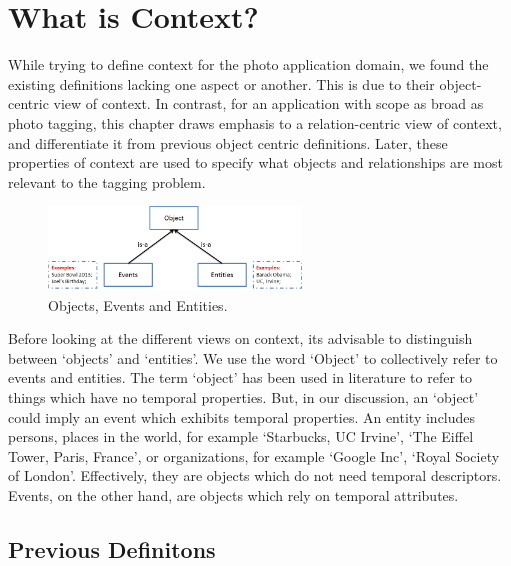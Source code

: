 \chapter{What is Context?}

While trying to define context for the photo application domain, we found the existing definitions lacking one aspect or another. This is due to their object-centric view of context. In contrast, for an application with scope as broad as photo tagging, this chapter draws emphasis to a relation-centric view of context, and differentiate it from previous object centric definitions. Later, these properties of context are used to specify what objects and relationships are most relevant to the tagging problem.
	
\begin{figure}[h]
\centering
\includegraphics[width=0.6\textwidth]{media/chapter1/terminology.png}
\caption{Objects, Events and Entities.}
\label{fig:terminology}
\end{figure}

Before looking at the different views on context, its advisable to distinguish between `objects' and `entities'. We use the word `Object' to collectively refer to events and entities. The term `object' has been used in literature to refer to things which have no temporal properties. But, in our discussion, an `object' could imply an event which exhibits temporal properties. An entity includes persons, places in the world, for example `Starbucks, UC Irvine', `The Eiffel Tower, Paris, France', or organizations, for example `Google Inc', `Royal Society of London'. Effectively, they are objects which do not need temporal descriptors. Events, on the other hand, are objects which rely on temporal attributes.

\section{Previous Definitons}

